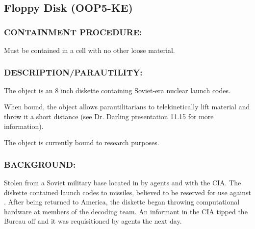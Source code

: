 \subsection*{Floppy Disk (OOP5-KE)}
\subsubsection*{CONTAINMENT PROCEDURE:}
\par Must be contained in a cell with no other
loose material.
\subsubsection*{DESCRIPTION/PARAUTILITY:}
	\par The object is an 8 inch diskette
	containing Soviet-era nuclear launch
	codes.
	\par When bound, the object allows parautilitarians to telekinetically lift
	material and throw it a short distance (see Dr. Darling
	presentation 11.15 for more information).
	\par The object is currently bound to 
	research purposes.
	\subsubsection*{BACKGROUND:}
	\par Stolen from a Soviet military base located in 
	by agents  and  with the CIA. The
	diskette contained launch codes to  missiles, believed to
	be reserved for use against . After being returned to
	America, the diskette began throwing computational hardware at
	members of the decoding team. An informant in the CIA tipped
	the Bureau off and it was requisitioned by agents the next day.